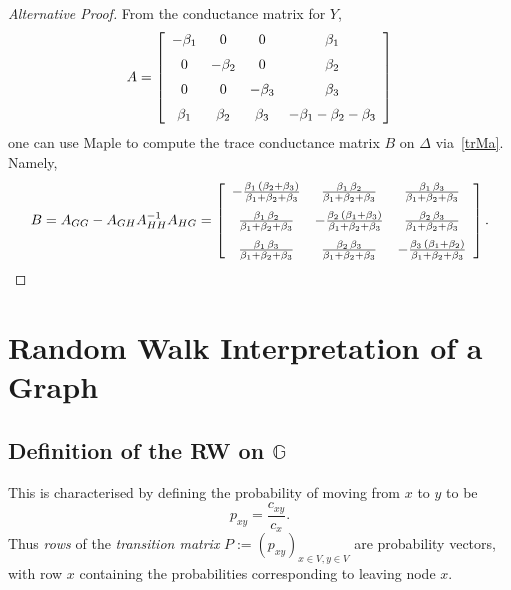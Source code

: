 \documentclass[a4paper]{amsart}
\theoremstyle{plain}
\theoremstyle{definition}
\theoremstyle{remark}
\begin{document}
\begin{proof}[Alternative Proof]  From the conductance matrix for $Y $, 
\[
A =  \left[ \begin {array}{cccc} -{\beta_1}&0&0&{\beta_1}
\\\noalign{\medskip}0&-{\beta_2}&0&{\beta_2}\\\noalign{\medskip}0&0&-{
\beta_3}&{\beta_3}\\\noalign{\medskip}{\beta_1}&{\beta_2}&{\beta_3}&-{\beta_1 }-{\beta_2}-{\beta_3}\end {array} \right] 
\] 
one can use Maple to compute the trace conductance matrix  $ B $ on $ \Delta$ via~\eqref{trMa}.  Namely,
\[
B =  A_{GG} - A_{GH} A_{HH}^{-1} A_{HG} =
 \left[ \begin {array}{ccc} -{\frac {{\beta_1}\, \left( {\beta_2}+{\beta_3} \right) }
 {{\beta_1}+{\beta_2}+{\beta_3}}}&{\frac {{\beta_1}\,{\beta_2}}
{{\beta_1}+{\beta_2}+{\beta_3}}}&{\frac {{\beta_1}\,{\beta_3}}{{\beta_1}+{
\beta_2}+{\beta_3}}}\\\noalign{\medskip}{\frac {{\beta_1}\,{\beta_2}}{{
\beta_1}+{\beta_2}+{\beta_3}}}&-{\frac {{\beta_2}\, \left( {\beta_1}+{  
\beta_3} \right) }{{\beta_1}+{\beta_2}+{\beta_3}}}&{\frac {{\beta_2}\,{\beta_3}}
{{\beta_1}+{\beta_2}+{\beta_3}}}\\\noalign{\medskip}{\frac {{\beta_1}\,{
\beta_3}}{{\beta_1}+{\beta_2}+{\beta_3}}}&{\frac {{\beta_2}\,{\beta_3}}{{
\beta_1}+{\beta_2}+{\beta_3}}}&-{\frac {{\beta_3}\, \left( {\beta_1}+{  
\beta_2} \right) }{{\beta_1}+{\beta_2}+{\beta_3}}}\end {array} \right].  
\]
\end{proof} 





\section{\textbf{Random Walk Interpretation of a Graph}}\label{rwi}

\subsection{Definition of the RW on  $ \mathbb{G} $ }  This is characterised by defining the probability of moving from $ x $ to $ y $ to be
\begin{equation} \label{}
p_{xy} = \frac{c_{xy}}{c_x}.
\end{equation}
Thus \emph{rows} of the \emph{transition matrix} $ P:= (p_{xy})_{x\in V, y\in V}  $ are probability vectors, with row $ x $ containing the probabilities corresponding to  leaving node $ x $.
\end{document}
